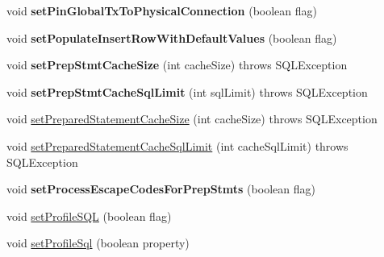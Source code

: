 \begin{DoxyCompactItemize}
\item 
\mbox{\label{classcom_1_1mysql_1_1jdbc_1_1_multi_host_my_s_q_l_connection_a9180346c2f0c363042fa04d854284f5f}} 
void {\bfseries set\+Pin\+Global\+Tx\+To\+Physical\+Connection} (boolean flag)
\item 
\mbox{\label{classcom_1_1mysql_1_1jdbc_1_1_multi_host_my_s_q_l_connection_a9427d27e72f5a50f8be8eb27cbe61e79}} 
void {\bfseries set\+Populate\+Insert\+Row\+With\+Default\+Values} (boolean flag)
\item 
\mbox{\label{classcom_1_1mysql_1_1jdbc_1_1_multi_host_my_s_q_l_connection_a271f985d93ac2de71f575ba71cf8ffb2}} 
void {\bfseries set\+Prep\+Stmt\+Cache\+Size} (int cache\+Size)  throws S\+Q\+L\+Exception 
\item 
\mbox{\label{classcom_1_1mysql_1_1jdbc_1_1_multi_host_my_s_q_l_connection_a8ddbb81f8d000ee77116a874c90cb73c}} 
void {\bfseries set\+Prep\+Stmt\+Cache\+Sql\+Limit} (int sql\+Limit)  throws S\+Q\+L\+Exception 
\item 
void \mbox{\hyperlink{classcom_1_1mysql_1_1jdbc_1_1_multi_host_my_s_q_l_connection_a05873fd9b3404787c16dd6ae3793d84e}{set\+Prepared\+Statement\+Cache\+Size}} (int cache\+Size)  throws S\+Q\+L\+Exception 
\item 
void \mbox{\hyperlink{classcom_1_1mysql_1_1jdbc_1_1_multi_host_my_s_q_l_connection_aeab0c45eb21ae847d8275f48c9bf045b}{set\+Prepared\+Statement\+Cache\+Sql\+Limit}} (int cache\+Sql\+Limit)  throws S\+Q\+L\+Exception 
\item 
\mbox{\label{classcom_1_1mysql_1_1jdbc_1_1_multi_host_my_s_q_l_connection_af96f0455620cf644205d0d4827923f9a}} 
void {\bfseries set\+Process\+Escape\+Codes\+For\+Prep\+Stmts} (boolean flag)
\item 
void \mbox{\hyperlink{classcom_1_1mysql_1_1jdbc_1_1_multi_host_my_s_q_l_connection_a4cf77def253941b0c23f1ca26f9da972}{set\+Profile\+S\+QL}} (boolean flag)
\item 
void \mbox{\hyperlink{classcom_1_1mysql_1_1jdbc_1_1_multi_host_my_s_q_l_connection_a3da8b80a49c914ce7bcead678775fbbc}{set\+Profile\+Sql}} (boolean property)

\end{DoxyCompactItemize}
